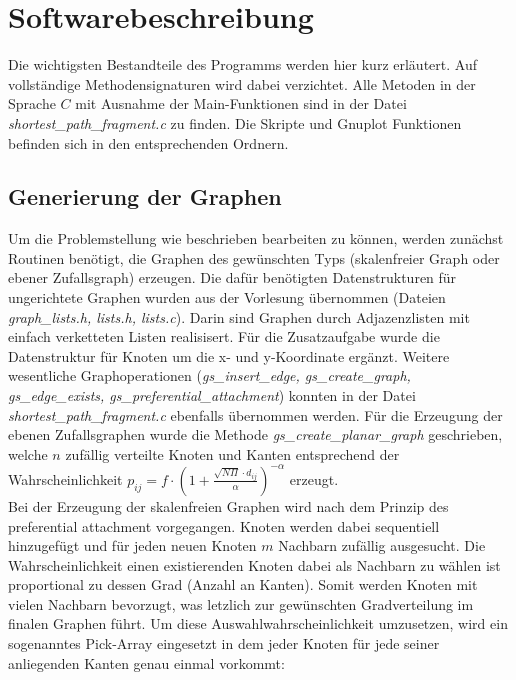 \documentclass[10pt]{article}
\begin{document}
\section{Softwarebeschreibung}

Die wichtigsten Bestandteile des Programms werden hier kurz erläutert. Auf vollständige Methodensignaturen wird dabei verzichtet. Alle Metoden in der Sprache $C$ mit Ausnahme der Main-Funktionen sind in der Datei \textit{shortest\_path\_fragment.c} zu finden. Die Skripte und Gnuplot Funktionen befinden sich in den entsprechenden Ordnern.

\subsection{Generierung der Graphen}
Um die Problemstellung wie beschrieben bearbeiten zu können, werden zunächst Routinen benötigt, die Graphen des gewünschten Typs (skalenfreier Graph oder ebener Zufallsgraph) erzeugen. Die dafür benötigten Datenstrukturen für ungerichtete Graphen wurden aus der Vorlesung übernommen (Dateien \textit{graph\_lists.h, lists.h, lists.c}). Darin sind Graphen durch Adjazenzlisten mit einfach verketteten Listen realisisert. Für die Zusatzaufgabe wurde die Datenstruktur für Knoten um die x- und y-Koordinate ergänzt. Weitere wesentliche Graphoperationen (\textit{gs\_insert\_edge, gs\_create\_graph, gs\_edge\_exists, gs\_preferential\_attachment}) konnten in der Datei \textit{shortest\_path\_fragment.c} ebenfalls übernommen werden. Für die Erzeugung der ebenen Zufallsgraphen wurde die Methode \textit{gs\_create\_planar\_graph} geschrieben, welche $n$ zufällig verteilte Knoten und Kanten entsprechend der Wahrscheinlichkeit $p_{ij} = f \cdot (1 + \frac{\sqrt{N \Pi} \cdot d_{ij}}{\alpha})^{-\alpha}$ erzeugt.\\

Bei der Erzeugung der skalenfreien Graphen wird nach dem Prinzip des preferential attachment vorgegangen. Knoten werden dabei sequentiell hinzugefügt und für jeden neuen Knoten $m$ Nachbarn zufällig ausgesucht. Die Wahrscheinlichkeit einen existierenden Knoten dabei als Nachbarn zu wählen ist proportional zu dessen Grad (Anzahl an Kanten). Somit werden Knoten mit vielen Nachbarn bevorzugt, was letzlich zur gewünschten Gradverteilung im finalen Graphen führt. Um diese Auswahlwahrscheinlichkeit umzusetzen, wird ein sogenanntes Pick-Array eingesetzt in dem jeder Knoten für jede seiner anliegenden Kanten genau einmal vorkommt: \\
\end{document}
